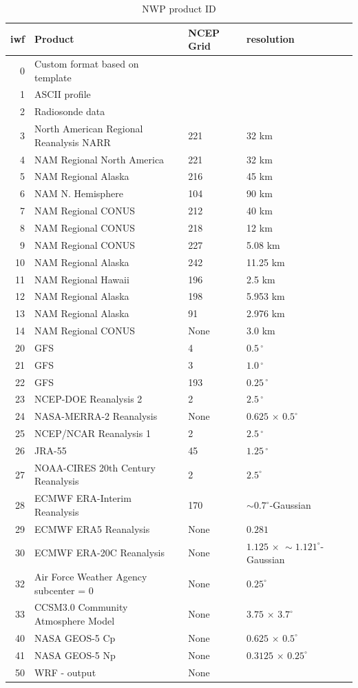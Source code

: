 \documentclass[11pt]{article}   %
\begin{document}
\begin{table}[h]\label{Tabiwf}
\caption{NWP product ID}
\begin{tabular}{| r | l | l | l |}
\hline
iwf & Product & NCEP Grid & resolution \\
\hline
  0 & Custom format based on template & & \\
  1 & ASCII profile & & \\
  2 & Radiosonde data & & \\
\hline
  3 & North American Regional Reanalysis NARR & 221 & 32 km \\
  4 & NAM Regional North America & 221 & 32 km \\
  5 & NAM Regional Alaska & 216 & 45 km \\
  6 & NAM N. Hemisphere & 104 & 90 km \\
  7 & NAM Regional CONUS & 212 & 40 km \\
  8 & NAM Regional CONUS & 218 & 12 km \\
  9 & NAM Regional CONUS & 227 & 5.08 km \\
 10 & NAM Regional Alaska & 242 & 11.25 km \\
 11 & NAM Regional Hawaii & 196 & 2.5 km \\
 12 & NAM Regional Alaska & 198 & 5.953 km \\
 13 & NAM Regional Alaska & 91 & 2.976 km \\
 14 & NAM Regional CONUS & None & 3.0 km \\
\hline
 20 & GFS & 4   & $ 0.5 \, ^{\circ}$ \\
 21 & GFS & 3   & $ 1.0 \, ^{\circ}$ \\
 22 & GFS & 193 & $0.25 \, ^{\circ}$ \\
 23 & NCEP-DOE Reanalysis 2 & 2  & $2.5 \, ^{\circ}$ \\
 24 & NASA-MERRA-2 Reanalysis & None & $0.625 \, \times \,0.5^{\circ}$ \\
 25 & NCEP/NCAR Reanalysis 1 & 2 & $2.5 \, ^{\circ}$ \\
 26 & JRA-55 & 45 & $1.25 \, ^{\circ}$ \\
 27 & NOAA-CIRES 20th Century Reanalysis & 2 & $2.5^{\circ}$ \\
 28 & ECMWF ERA-Interim Reanalysis & 170 & $\sim 0.7^{\circ}$-Gaussian \\
 29 & ECMWF ERA5 Reanalysis & None & $0.281$ \\
 30 & ECMWF ERA-20C Reanalysis & None & $1.125 \, \times \, \sim 1.121^{\circ}$-Gaussian\\
\hline
 32 & Air Force Weather Agency subcenter = 0 & None & $0.25^{\circ}$ \\
 33 & CCSM3.0 Community Atmosphere Model &None & $3.75 \, \times \,3.7^{\circ}$\\
\hline
 40 & NASA GEOS-5 Cp & None & $0.625 \, \times \,0.5^{\circ}$ \\
 41 & NASA GEOS-5 Np & None & $0.3125 \, \times \,0.25^{\circ}$\\
 50 & WRF - output & None & \\
\hline
\end{tabular}
\end{table}
\clearpage
\end{document}
